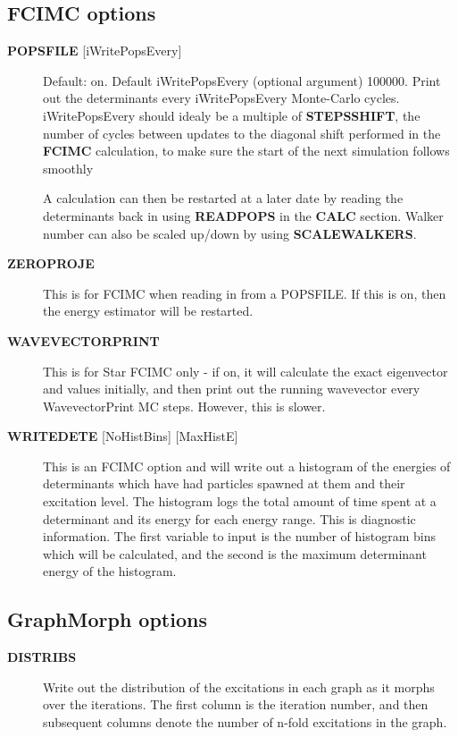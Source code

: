 \documentclass[openany,a4paper,10pt]{manual}
\begin{document}
\subsection{FCIMC options}
\begin{description}
\item[\textbf{POPSFILE} {[}iWritePopsEvery{]}]
Default: on.  Default iWritePopsEvery (optional argument) 100000.
Print out the determinants every iWritePopsEvery Monte-Carlo cycles.
iWritePopsEvery should idealy be a multiple of \textbf{STEPSSHIFT}, the number of
cycles between updates to the diagonal shift performed in the
\textbf{FCIMC} calculation, to make sure the start of the next simulation follows
smoothly

A calculation can then be restarted at a later date by reading the
determinants back in using \textbf{READPOPS} in the \textbf{CALC} section.
Walker number can also be scaled up/down by using \textbf{SCALEWALKERS}.

\item[\textbf{ZEROPROJE}]
This is for FCIMC when reading in from a POPSFILE. If this is on, then the energy
estimator will be restarted.

\item[\textbf{WAVEVECTORPRINT}]
This is for Star FCIMC only - if on, it will calculate the exact eigenvector and
values initially, and then print out the running wavevector every
WavevectorPrint MC steps. However, this is slower.

\item[\textbf{WRITEDETE} {[}NoHistBins{]} {[}MaxHistE{]}]
This is an FCIMC option and will write out a histogram of the energies of determinants which have
had particles spawned at them and their excitation level. The histogram logs the total
amount of time spent at a determinant and its energy for each energy range. This is diagnostic
information. The first variable to input is the number of histogram bins which will be calculated,
and the second is the maximum determinant energy of the histogram.

\end{description}


\subsection{GraphMorph options}
\begin{description}
\item[\textbf{DISTRIBS}]
Write out the distribution of the excitations in each graph as it
morphs over the iterations. The first column is the iteration number, and
then subsequent columns denote the number of n-fold excitations in
the graph.

\end{description}
\end{document}
